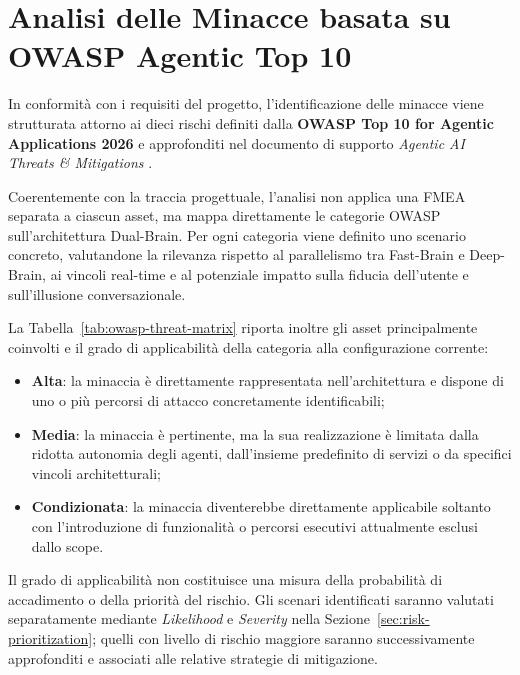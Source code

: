 \documentclass[11pt,a4paper]{article}
\begin{document}
\section{Analisi delle Minacce basata su OWASP Agentic Top 10}
\label{sec:owasp-agentic-analysis}

In conformità con i requisiti del progetto, l'identificazione delle
minacce viene strutturata attorno ai dieci rischi definiti dalla
\textbf{OWASP Top 10 for Agentic Applications 2026}
\cite{owaspagentic} e approfonditi nel documento di supporto
\textit{Agentic AI Threats \& Mitigations}
\cite{owaspagenticthreats}.

Coerentemente con la traccia progettuale, l'analisi non applica una
FMEA separata a ciascun asset, ma mappa direttamente le categorie
OWASP sull'architettura Dual-Brain. Per ogni categoria viene definito
uno scenario concreto, valutandone la rilevanza rispetto al
parallelismo tra Fast-Brain e Deep-Brain, ai vincoli real-time e al
potenziale impatto sulla fiducia dell'utente e sull'illusione
conversazionale.

La Tabella~\ref{tab:owasp-threat-matrix} riporta inoltre gli asset
principalmente coinvolti e il grado di applicabilità della categoria
alla configurazione corrente:

\begin{itemize}
    \item \textbf{Alta}: la minaccia è direttamente rappresentata
    nell'architettura e dispone di uno o più percorsi di attacco
    concretamente identificabili;

    \item \textbf{Media}: la minaccia è pertinente, ma la sua
    realizzazione è limitata dalla ridotta autonomia degli agenti,
    dall'insieme predefinito di servizi o da specifici vincoli
    architetturali;

    \item \textbf{Condizionata}: la minaccia diventerebbe direttamente
    applicabile soltanto con l'introduzione di funzionalità o percorsi
    esecutivi attualmente esclusi dallo scope.
\end{itemize}

Il grado di applicabilità non costituisce una misura della probabilità
di accadimento o della priorità del rischio. Gli scenari identificati
saranno valutati separatamente mediante \emph{Likelihood} e
\emph{Severity} nella Sezione~\ref{sec:risk-prioritization}; quelli
con livello di rischio maggiore saranno successivamente approfonditi
e associati alle relative strategie di mitigazione.
\end{document}
